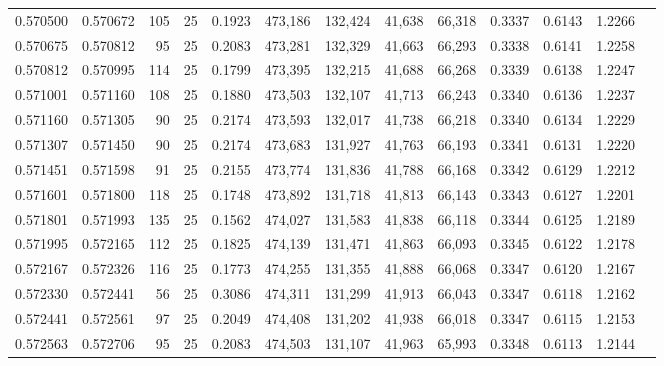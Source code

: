\begin{tabular}{rrrrrrrrrrrrr}
0.570500 & 0.570672 &   105 &  25 &                                     0.1923 & 473,186 & 132,424 &  41,638 &  66,318 & 0.3337 & 0.6143 & 1.2266 \\
0.570675 & 0.570812 &    95 &  25 &                                     0.2083 & 473,281 & 132,329 &  41,663 &  66,293 & 0.3338 & 0.6141 & 1.2258 \\
0.570812 & 0.570995 &   114 &  25 &                                     0.1799 & 473,395 & 132,215 &  41,688 &  66,268 & 0.3339 & 0.6138 & 1.2247 \\
0.571001 & 0.571160 &   108 &  25 &                                     0.1880 & 473,503 & 132,107 &  41,713 &  66,243 & 0.3340 & 0.6136 & 1.2237 \\
0.571160 & 0.571305 &    90 &  25 &                                     0.2174 & 473,593 & 132,017 &  41,738 &  66,218 & 0.3340 & 0.6134 & 1.2229 \\
0.571307 & 0.571450 &    90 &  25 &                                     0.2174 & 473,683 & 131,927 &  41,763 &  66,193 & 0.3341 & 0.6131 & 1.2220 \\
0.571451 & 0.571598 &    91 &  25 &                                     0.2155 & 473,774 & 131,836 &  41,788 &  66,168 & 0.3342 & 0.6129 & 1.2212 \\
0.571601 & 0.571800 &   118 &  25 &                                     0.1748 & 473,892 & 131,718 &  41,813 &  66,143 & 0.3343 & 0.6127 & 1.2201 \\
0.571801 & 0.571993 &   135 &  25 &                                     0.1562 & 474,027 & 131,583 &  41,838 &  66,118 & 0.3344 & 0.6125 & 1.2189 \\
0.571995 & 0.572165 &   112 &  25 &                                     0.1825 & 474,139 & 131,471 &  41,863 &  66,093 & 0.3345 & 0.6122 & 1.2178 \\
0.572167 & 0.572326 &   116 &  25 &                                     0.1773 & 474,255 & 131,355 &  41,888 &  66,068 & 0.3347 & 0.6120 & 1.2167 \\
0.572330 & 0.572441 &    56 &  25 &                                     0.3086 & 474,311 & 131,299 &  41,913 &  66,043 & 0.3347 & 0.6118 & 1.2162 \\
0.572441 & 0.572561 &    97 &  25 &                                     0.2049 & 474,408 & 131,202 &  41,938 &  66,018 & 0.3347 & 0.6115 & 1.2153 \\
0.572563 & 0.572706 &    95 &  25 &                                     0.2083 & 474,503 & 131,107 &  41,963 &  65,993 & 0.3348 & 0.6113 & 1.2144 \\

\end{tabular}
